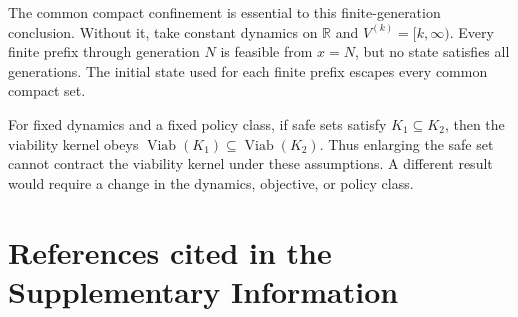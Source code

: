 \documentclass[preprint,11pt,authoryear]{elsarticle}
\theoremstyle{remark}
\begin{document}
The common compact confinement is essential to this finite-generation conclusion. Without it, take constant dynamics on $\mathbb R$ and $V^{(k)}=[k,\infty)$. Every finite prefix through generation $N$ is feasible from $x=N$, but no state satisfies all generations. The initial state used for each finite prefix escapes every common compact set.

For fixed dynamics and a fixed policy class, if safe sets satisfy $K_1\subseteq K_2$, then the viability kernel obeys $\operatorname{Viab}(K_1)\subseteq\operatorname{Viab}(K_2)$. Thus enlarging the safe set cannot contract the viability kernel under these assumptions. A different result would require a change in the dynamics, objective, or policy class.

\section*{References cited in the Supplementary Information}
\end{document}
